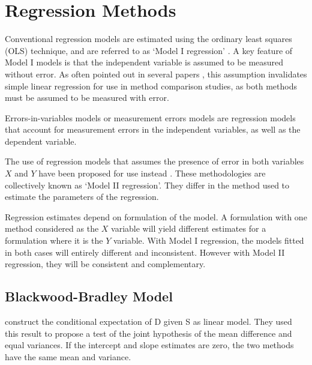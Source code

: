 \documentclass[12pt, a4paper]{report}
\theoremstyle{plain}
\theoremstyle{definition}
\theoremstyle{remark}
\begin{document}



\section{Regression Methods}
Conventional regression models are estimated using the ordinary
least squares (OLS) technique, and are referred to as `Model I
regression' \citep{CornCoch,ludbrook97}. A key feature of Model I
models is that the independent variable is assumed to be measured
without error. As often pointed out in several papers
\citep{BA83,ludbrook97}, this assumption invalidates simple linear
regression for use in method comparison studies, as both methods
must be assumed to be measured with error.

Errors-in-variables models or measurement errors models are regression models that account for measurement errors in the independent variables, as well as the dependent variable.


The use of regression models that assumes the presence of error in
both variables $X$ and $Y$ have been proposed for use instead
\citep{CornCoch,ludbrook97}. These methodologies are collectively
known as `Model II regression'. They differ in the method used to
estimate the parameters of the regression.

Regression estimates depend on formulation of the model. A
formulation with one method considered as the $X$ variable will
yield different estimates for a formulation where it is the $Y$
variable. With Model I regression, the models fitted in both cases
will entirely different and inconsistent. However with Model II
regression, they will be consistent and complementary.





	
\subsection{Blackwood-Bradley Model} 
	\citet{BB89} construct the conditional expectation of D given S as linear model. They used this result to propose a test of the joint hypothesis of the mean difference and equal variances. If the intercept and slope estimates are zero, the two methods have the same mean and variance.
	
\end{document}

